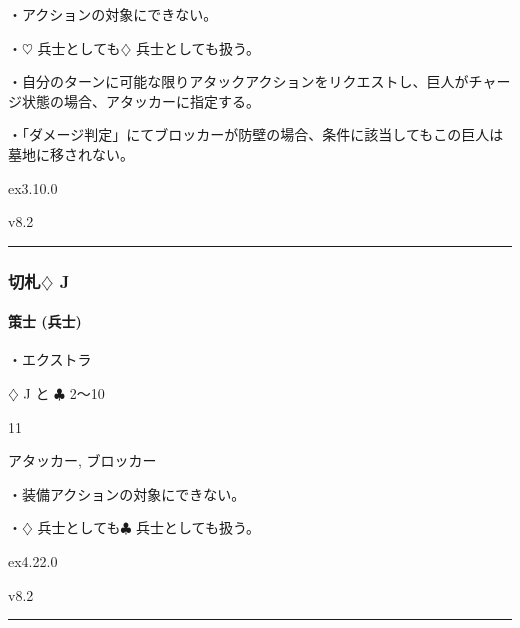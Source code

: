 \documentclass[letterpaper,10pt,dvipdfmx]{sphinxmanual}
\begin{document}
\sphinxAtStartPar
・アクションの対象にできない。

\sphinxAtStartPar
・{\normalsize $\heartsuit$} 兵士としても{\normalsize $\diamondsuit$} 兵士としても扱う。

\sphinxAtStartPar
・自分のターンに可能な限りアタックアクションをリクエストし、巨人がチャージ状態の場合、アタッカーに指定する。

\sphinxAtStartPar
・「ダメージ判定」にてブロッカーが防壁の場合、条件に該当してもこの巨人は墓地に移されない。

\sphinxAtStartPar
{}  ex3.10.0

\sphinxAtStartPar
{}  v8.2


\bigskip\hrule\bigskip



\subsubsection{切札{\normalsize $\diamondsuit$} J}
\label{\detokenize{auto/frameActionlist:id95}}

\paragraph{策士 (兵士)}
\label{\detokenize{auto/frameActionlist:char-strategist}}\label{\detokenize{auto/frameActionlist:id96}}
\sphinxAtStartPar
{}

\sphinxAtStartPar
・エクストラ

\sphinxAtStartPar
{} {\normalsize $\diamondsuit$} J と {\normalsize $\clubsuit$} 2〜10

\sphinxAtStartPar
{} 11

\sphinxAtStartPar
{} アタッカー, ブロッカー

\sphinxAtStartPar
{}

\sphinxAtStartPar
・装備アクションの対象にできない。

\sphinxAtStartPar
・{\normalsize $\diamondsuit$} 兵士としても{\normalsize $\clubsuit$} 兵士としても扱う。

\sphinxAtStartPar
{}  ex4.22.0

\sphinxAtStartPar
{}  v8.2


\bigskip\hrule\bigskip
\end{document}
